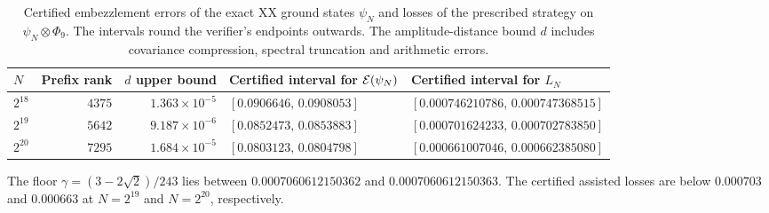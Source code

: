 \begin{table}[htb]
\centering\small
\begin{tabular}{@{}lrrll@{}}
\toprule
\(N\) & Prefix rank & \(d\) upper bound & Certified interval for \(\mathcal{E}(\psi_N)\) &
  Certified interval for \(L_N\)\\
\midrule
\(2^{18}\) & \(4375\) & \(1.363\times10^{-5}\) &
  \([0.0906646,\,0.0908053]\) &
  \([0.000746210786,\,0.000747368515]\)\\
\(2^{19}\) & \(5642\) & \(9.187\times10^{-6}\) &
  \([0.0852473,\,0.0853883]\) &
  \([0.000701624233,\,0.000702783850]\)\\
\(2^{20}\) & \(7295\) & \(1.684\times10^{-5}\) &
  \([0.0803123,\,0.0804798]\) &
  \([0.000661007046,\,0.000662385080]\)\\
\bottomrule
\end{tabular}
\caption{Certified embezzlement errors of the exact XX ground states
$\psi_N$ and losses of the prescribed strategy on $\psi_N\otimes\Phi_9$.
The intervals round the verifier's endpoints outwards. The amplitude-distance
bound $d$ includes covariance compression, spectral truncation and arithmetic
errors.}
\label{tab:xx-assisted-certificate}
\end{table}

The floor \(\gamma=(3-2\sqrt2)/243\) lies between
\(0.0007060612150362\) and \(0.0007060612150363\).
The certified assisted losses are below \(0.000703\) and \(0.000663\)
at \(N=2^{19}\) and \(N=2^{20}\), respectively.
